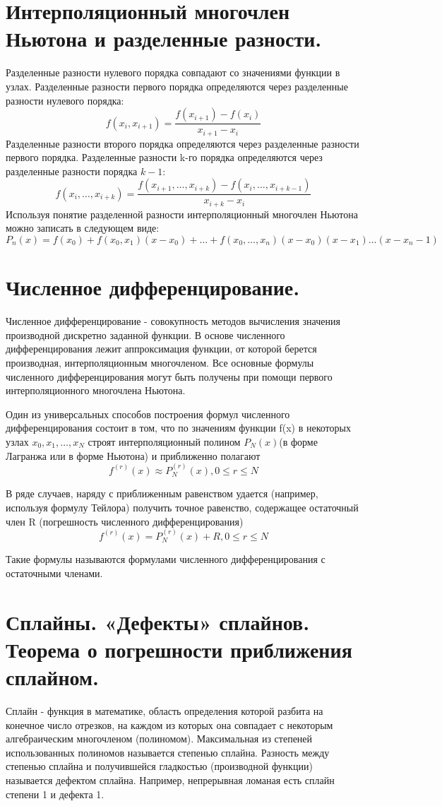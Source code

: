 \documentclass[a4paper, 12pt]{article}
\begin{document}
\section{Интерполяционный многочлен Ньютона и разделенные разности.}
Разделенные разности нулевого порядка совпадают со значениями функции в узлах. Разделенные разности первого порядка определяются через разделенные разности нулевого порядка: 
\[
       f(x_i,x_{i+1}) = \frac{f(x_{i+1}) - f(x_i)}{x_{i+1}-x_i}
\]
Разделенные разности второго порядка определяются через разделенные разности первого порядка. Разделенные разности k-го порядка определяются через разделенные разности порядка $ k-1 $:
\[
        f(x_i,\ldots,x_{i+k}) = \frac{f(x_{i+1},\ldots,x_{i+k}) - f(x_i,\ldots,x_{i+k-1})}{x_{i+k}-x_i}
\]
Используя понятие разделенной разности интерполяционный многочлен Ньютона можно записать в следующем виде: 
\[
       P_n(x) = f(x_0) + f(x_0,x_1)(x - x_0) + \ldots + f(x_0,\ldots,x_n)(x-x_0)(x-x_1)\ldots(x-x_n-1)
\]
\section{Численное дифференцирование.}
Численное дифференцирование - совокупность методов вычисления значения производной дискретно заданной функции. В основе численного дифференцирования лежит аппроксимация функции, от которой берется производная, интерполяционным многочленом. Все основные формулы численного дифференцирования могут быть получены при помощи первого интерполяционного многочлена Ньютона.

Один из универсальных способов построения формул численного дифференцирования состоит в том, что по значениям функции f(x) в некоторых узлах $ x_{0},x_{1},\ldots ,x_{N} $ строят интерполяционный полином $ P_{N}(x) $(в форме Лагранжа или в форме Ньютона) и приближенно полагают
\[
       f^{{(r)}}(x)\approx P_{N}^{{(r)}}(x),0\leq r\leq N
\]

В ряде случаев, наряду с приближенным равенством удается (например, используя формулу Тейлора) получить точное равенство, содержащее остаточный член R (погрешность численного дифференцирования)
\[
       f^{{(r)}}(x)=P_{N}^{{(r)}}(x)+R,0\leq r\leq N
\]

Такие формулы называются формулами численного дифференцирования с остаточными членами. 
\section{Сплайны. «Дефекты» сплайнов. Теорема о погрешности приближения сплайном.}
Сплайн - функция в математике, область определения которой разбита на конечное число отрезков, на каждом из которых она совпадает с некоторым алгебраическим многочленом (полиномом). Максимальная из степеней использованных полиномов называется степенью сплайна. Разность между степенью сплайна и получившейся гладкостью (производной функции) называется дефектом сплайна. Например, непрерывная ломаная есть сплайн степени 1 и дефекта 1.
\end{document}
